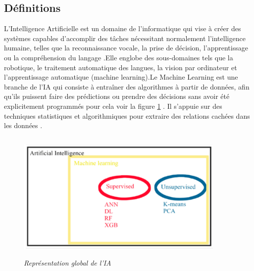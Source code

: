 \documentclass[a4paper,12pt,openany]{report}
\begin{document}
	\subsection{  Définitions }
	\quad L’Intelligence Artificielle est un domaine de l’informatique qui vise à créer des systèmes capables d’accomplir des tâches nécessitant normalement l’intelligence humaine, telles que la reconnaissance vocale, la prise de décision, l’apprentissage ou la compréhension du langage \cite{Russell2020}.Elle englobe des sous-domaines tels que la robotique, le traitement automatique des langues, la vision par ordinateur et l’apprentissage automatique (machine learning).Le Machine Learning  est une branche de l’IA qui consiste à entraîner des algorithmes à partir de données, afin qu’ils puissent faire des prédictions ou prendre des décisions sans avoir été explicitement programmés pour cela voir la figure \ref{Fig 1.5 } \cite{Mitchell1997}. Il s’appuie sur des techniques statistiques et algorithmiques pour extraire des relations cachées dans les données  . \\
	\begin{figure}[H]
		\begin{center}
	    	    \begin{minipage}{\textwidth}
	    	     \begin{center}
	    	      \includegraphics[width=0.9\textwidth,height=2.5in]{images/Inteligence_Artificielle.png}
	    	      \end{center}
	    	     \end{minipage}
			\caption{\emph{Représentation global de l'IA \cite{Mitchell1997} \label{Fig 1.5 }}}
		\end{center}
	\end{figure}%
\end{document}
